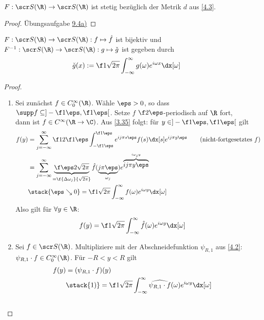 \begin{nt} \label{4.9}
	$F : \scr S(\R) \to \scr S(\R)$ ist stetig bezüglich der Metrik $d$ aus \ref{4.3}.
	\begin{proof}
		Übungsaufgabe \href{http://www.iadm.uni-stuttgart.de/LstAnaMPhy/Lesky/Vorlesungen/13-Hoehere-Analysis/blatt09.pdf}{9.4a)}
	\end{proof}
\end{nt}

\begin{st} \label{4.10}
	$F: \scr S(\R) \to \scr S(\R): f \mapsto \hat f$ ist bijektiv und $F^{-1}: \scr S(\R) \to \scr S(\R) : g \mapsto \check g$ ist gegeben durch
	\[
		\check g(x) := \f 1{\sqrt{2\pi}} \int_{-\infty}^\infty g(\omega) e^{i \omega x} \dx[\omega]
	\]
	\begin{proof}
		\begin{enumerate}[1)]
			\item
				Sei zunächst $f \in C_0^\infty(\R)$.
				Wähle $\eps > 0$, so dass $\supp f \subset ]-\f 1\eps, \f 1\eps[$.
				Setze $f$ $\f 2\eps$-periodisch auf $\R$ fort, dann ist $f \in C^\infty (\R \to \C)$.
				Aus \ref{3.35} folgt: für $y \in ]-\f 1\eps, \f 1\eps[$ gilt
				\begin{align*}
					f(y) 
					&= \sum_{j=-\infty}^\infty \f 1{2 \f 1\eps} \int_{-\f 1\eps}^{\f 1\eps} e^{ij\pi s \eps} f(s) \dx[s] e^{ij\pi y \eps} \qquad \text{(nicht-fortgesetztes $f$)}\\
					&= \sum_{j=-\infty}^\infty \underbrace{\f \eps 2 \sqrt{2\pi}}_{= \f {\Delta \omega_j}{\sqrt{2\pi}}} \hat f(\underbrace{j\pi \eps}_{\omega_j}) e^{\overbrace{ij\pi y \eps}^{i\omega_j y}} \\
					&\stack{\eps \searrow 0}= \f 1{\sqrt{2\pi}} \int_{-\infty}^\infty f(\omega) e^{i\omega y} \dx[\omega]
				\end{align*}
				Also gilt für $\forall y \in \R$:
				\[
					f(y) = \f 1{\sqrt{2\pi}} \int_{-\infty}^\infty \hat f(\omega) e^{i \omega y} \dx[\omega]
				\]
			\item
				Sei $f \in \scr S(\R)$.
				Multipliziere mit der Abschneidefunktion $\psi_{R,1}$ aus \ref{4.2}: $\psi_{R,1}\cdot f \in C_0^\infty(\R)$.
				Für $-R < y < R$ gilt
				\begin{align*}
					f(y) 
					&= (\psi_{R,1}\cdot f)(y) \\
					&\stack{1)}= \f 1{\sqrt{2\pi}} \int_{-\infty}^\infty \widehat{\psi_{R,1} \cdot f}(\omega) e^{i\omega y} \dx[\omega]
				\end{align*}
				\begin{align*}

\end{align*}
\end{enumerate}
\end{proof}
\end{st}
